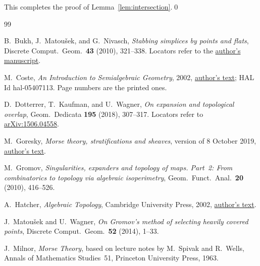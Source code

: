 \documentclass[11pt]{article}
\theoremstyle{definition}
\numberwithin{equation}{section}
\begin{document}
This completes the proof of Lemma~\ref{lem:intersection}.\qed

\begin{thebibliography}{99}

B.~Bukh, J.~Matou\v{s}ek, and G.~Nivasch,
\emph{Stabbing simplices by points and flats},
Discrete Comput.\ Geom.\ \textbf{43} (2010), 321--338.
Locators refer to the \href{https://kam.mff.cuni.cz/~matousek/first_sel_lemma.pdf}{author's manuscript}.

M.~Coste,
\emph{An Introduction to Semialgebraic Geometry}, 2002,
\href{https://perso.univ-rennes1.fr/michel.coste/polyens/SAG.pdf}{author's text}; HAL Id hal-05407113. Page numbers are the printed ones.

D.~Dotterrer, T.~Kaufman, and U.~Wagner,
\emph{On expansion and topological overlap},
Geom.\ Dedicata \textbf{195} (2018), 307--317.
Locators refer to \href{https://arxiv.org/abs/1506.04558}{arXiv:1506.04558}.

M.~Goresky,
\emph{Morse theory, stratifications and sheaves}, version of 8 October 2019,
\href{https://www.math.ias.edu/~goresky/pdf/ShMo.pdf}{author's text}.

M.~Gromov,
\emph{Singularities, expanders and topology of maps. Part~2: From combinatorics to topology via algebraic isoperimetry},
Geom.\ Funct.\ Anal.\ \textbf{20} (2010), 416--526.

A.~Hatcher,
\emph{Algebraic Topology}, Cambridge University Press, 2002,
\href{https://pi.math.cornell.edu/~hatcher/AT/AT.pdf}{author's text}.

J.~Matou\v{s}ek and U.~Wagner,
\emph{On Gromov's method of selecting heavily covered points},
Discrete Comput.\ Geom.\ \textbf{52} (2014), 1--33.

J.~Milnor,
\emph{Morse Theory}, based on lecture notes by M.~Spivak and R.~Wells,
Annals of Mathematics Studies~51, Princeton University Press, 1963.

\end{thebibliography}
\end{document}

